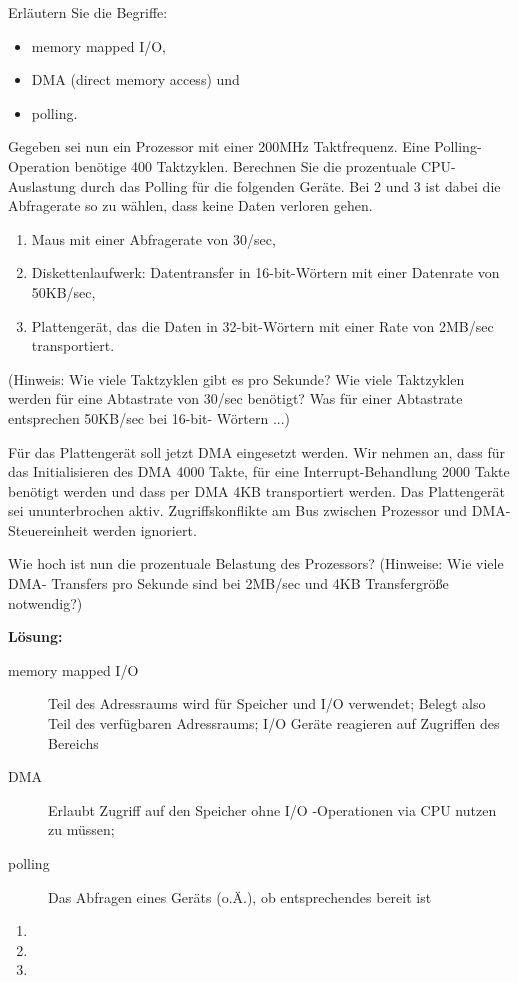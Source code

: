 

\begin{description}

Erläutern Sie die Begriffe: 
    \begin{itemize}
      \item memory mapped I/O,  
      \item DMA (direct memory access) und 
      \item polling. 
    \end{itemize}
Gegeben sei nun ein Prozessor mit einer 200MHz Taktfrequenz. Eine Polling-Operation 
benötige 400 Taktzyklen. Berechnen Sie die prozentuale CPU-Auslastung durch das Polling für die folgenden Geräte. Bei 2 und 3 ist dabei die Abfragerate so zu wählen, dass keine Daten verloren gehen. 
    \begin{enumerate}[label=\arabic*.]
      \item Maus mit einer Abfragerate von 30/sec, 
      \item Diskettenlaufwerk: Datentransfer in 16-bit-Wörtern mit einer Datenrate von 50KB/sec, 
      \item Plattengerät, das die Daten in 32-bit-Wörtern mit einer Rate von 2MB/sec transportiert. 
    \end{enumerate}
(Hinweis: Wie viele Taktzyklen gibt es pro Sekunde? Wie viele Taktzyklen werden für eine 
Abtastrate von 30/sec benötigt? Was für einer Abtastrate entsprechen 50KB/sec bei 16-bit-
Wörtern ...) 

Für das Plattengerät soll jetzt DMA eingesetzt werden. Wir nehmen an, dass für das 
Initialisieren des DMA 4000 Takte, für eine Interrupt-Behandlung 2000 Takte benötigt werden und dass per DMA 4KB transportiert werden. Das Plattengerät sei ununterbrochen aktiv. 
Zugriffskonflikte am Bus zwischen Prozessor und DMA-Steuereinheit werden ignoriert. 

Wie hoch ist nun die prozentuale Belastung des Prozessors? (Hinweise: Wie viele DMA-
Transfers pro Sekunde sind bei 2MB/sec und 4KB Transfergröße notwendig?) 

\textbf{Lösung:}
    \begin{description}
      \item[memory mapped I/O]
        Teil des Adressraums wird für Speicher und I/O verwendet; Belegt also Teil des verfügbaren Adressraums; I/O Geräte reagieren auf Zugriffen des Bereichs
      \item[DMA]
        Erlaubt Zugriff auf den Speicher ohne I/O -Operationen via CPU nutzen zu müssen;
      \item[polling] Das Abfragen eines Geräts (o.Ä.), ob entsprechendes bereit ist
    \end{description}
    \begin{enumerate}
      \item
      \item
      \item
    \end{enumerate}


\end{description}
